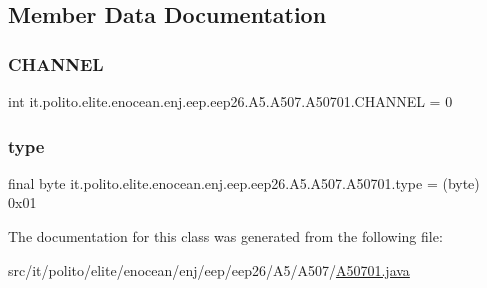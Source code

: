 \subsection{Member Data Documentation}
\hypertarget{classit_1_1polito_1_1elite_1_1enocean_1_1enj_1_1eep_1_1eep26_1_1_a5_1_1_a507_1_1_a50701_ad38c033ad861ab09f3d340676ffe4f8c}{}\label{classit_1_1polito_1_1elite_1_1enocean_1_1enj_1_1eep_1_1eep26_1_1_a5_1_1_a507_1_1_a50701_ad38c033ad861ab09f3d340676ffe4f8c} 
\subsubsection{\texorpdfstring{C\+H\+A\+N\+N\+EL}{CHANNEL}}
{\footnotesize\ttfamily int it.\+polito.\+elite.\+enocean.\+enj.\+eep.\+eep26.\+A5.\+A507.\+A50701.\+C\+H\+A\+N\+N\+EL = 0\hspace{0.3cm}{\ttfamily [static]}}

\hypertarget{classit_1_1polito_1_1elite_1_1enocean_1_1enj_1_1eep_1_1eep26_1_1_a5_1_1_a507_1_1_a50701_ac16e0f30050044fb64eabc3f397f8bb3}{}\label{classit_1_1polito_1_1elite_1_1enocean_1_1enj_1_1eep_1_1eep26_1_1_a5_1_1_a507_1_1_a50701_ac16e0f30050044fb64eabc3f397f8bb3} 
\subsubsection{\texorpdfstring{type}{type}}
{\footnotesize\ttfamily final byte it.\+polito.\+elite.\+enocean.\+enj.\+eep.\+eep26.\+A5.\+A507.\+A50701.\+type = (byte) 0x01\hspace{0.3cm}{\ttfamily [static]}}



The documentation for this class was generated from the following file\+:\begin{DoxyCompactItemize}
\item 
src/it/polito/elite/enocean/enj/eep/eep26/\+A5/\+A507/\hyperlink{_a50701_8java}{A50701.\+java}\end{DoxyCompactItemize}
